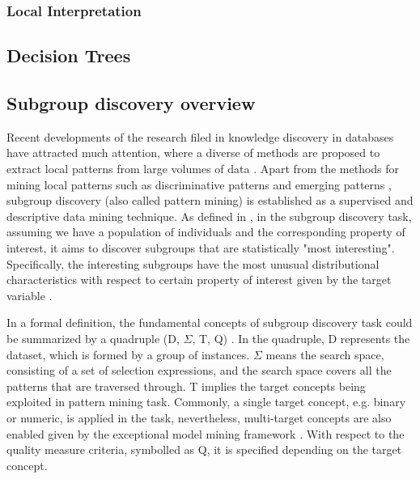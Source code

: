 \subsubsection{Local Interpretation}

\subsection{Decision Trees}


\subsection{Subgroup discovery overview}

Recent developments of the research filed in knowledge discovery in databases have attracted much attention, where a diverse of methods are proposed to extract local patterns from large volumes of data  \cite{fayyad1996data}. Apart from the methods for mining local patterns such as discriminative patterns \cite{cheng2008direct} and emerging patterns \cite{dong1999efficient}, subgroup discovery (also called pattern mining) is established as a supervised and descriptive data mining technique. As defined in \cite{herrera2011overview}, in the subgroup discovery task, assuming we have a population of individuals and the corresponding property of interest, it aims to discover subgroups that are statistically "most interesting". Specifically, the interesting subgroups have the most unusual distributional characteristics with respect to certain property of interest given by the target variable \cite{atzmueller2009fast}. 

In a formal definition, the fundamental concepts of subgroup discovery task could be summarized by a quadruple (D, $\Sigma$, T, Q) \cite{lemmerich2014novel}. In the quadruple, D represents the dataset, which is formed by a group of instances. $\Sigma$ means the search space, consisting of a set of selection expressions, and the search space covers all the patterns that are traversed through. T implies the target concepts being exploited in pattern mining task. Commonly, a single target concept, e.g. binary or numeric, is applied in the task, nevertheless, multi-target concepts are also enabled given by the exceptional model mining framework \cite{leman2008exceptional}. With respect to the quality measure criteria, symbolled as Q, it is specified depending on the target concept. 

